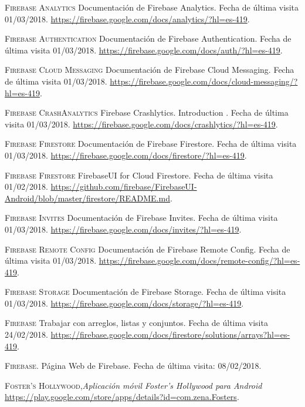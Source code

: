 \documentclass[twoside]{report}
\begin{document}
\begin{thebibliography}{a}
 \textsc{Firebase Analytics} 
Documentación de Firebase Analytics. Fecha de última visita 01/03/2018. \url{https://firebase.google.com/docs/analytics/?hl=es-419}.

 \textsc{Firebase Authentication} 
Documentación de Firebase Authentication. Fecha de última visita 01/03/2018. \url{https://firebase.google.com/docs/auth/?hl=es-419}.

 \textsc{Firebase Cloud Messaging} 
Documentación de Firebase Cloud Messaging. Fecha de última visita 01/03/2018. \url{https://firebase.google.com/docs/cloud-messaging/?hl=es-419}.

 \textsc{Firebase CrashAnalytics} 
Firebase Crashlytics. Introduction . Fecha de última visita 01/03/2018. \url{https://firebase.google.com/docs/crashlytics/?hl=es-419}.

 \textsc{Firebase Firestore} 
Documentación de Firebase Firestore. Fecha de última visita 01/03/2018. \url{https://firebase.google.com/docs/firestore/?hl=es-419}.

 \textsc{Firebase Firestore} FirebaseUI for Cloud Firestore. Fecha de última visita 01/02/2018. \url{https://github.com/firebase/FirebaseUI-Android/blob/master/firestore/README.md}.

 \textsc{Firebase Invites} 
Documentación de Firebase Invites. Fecha de última visita 01/03/2018. \url{https://firebase.google.com/docs/invites/?hl=es-419}.

 \textsc{Firebase Remote Config} 
Documentación de Firebase Remote Config. Fecha de última visita 01/03/2018. \url{https://firebase.google.com/docs/remote-config/?hl=es-419}.

 \textsc{Firebase Storage} 
Documentación de Firebase Storage. Fecha de última visita 01/03/2018. \url{https://firebase.google.com/docs/storage/?hl=es-419}.

 \textsc{Firebase} Trabajar con arreglos, listas y conjuntos. Fecha de última visita 24/02/2018.  \url{https://firebase.google.com/docs/firestore/solutions/arrays?hl=es-419}.

 \textsc{Firebase}. Página Web de Firebase. Fecha de última visita: 08/02/2018.

 \textsc{Foster's Hollywood},\textit{Aplicación móvil Foster's Hollywood para Android} \url{https://play.google.com/store/apps/details?id=com.zena.Fosters}.


\end{thebibliography}
\end{document}
